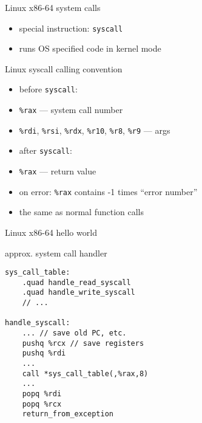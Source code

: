 \begin{frame}{Linux x86-64 system calls}
\begin{itemize}
\item special instruction: {\tt syscall}
\item runs OS specified code in kernel mode
\end{itemize}
\end{frame}

\begin{frame}[fragile,label=LinuxSyscall]{Linux syscall calling convention}
\begin{itemize}
\item before {\tt syscall}:
\item \lstinline|%rax| --- system call number
\item \lstinline|%rdi|, \lstinline|%rsi|, \lstinline|%rdx|, \lstinline|%r10|, \lstinline|%r8|, \lstinline|%r9| --- args
\vspace{.5cm}
\item after {\tt syscall}:
\item \lstinline|%rax| --- return value
\item on error: \lstinline|%rax| contains -1 times ``error number''
\vspace{.5cm}
\item {} the same as normal function calls
\end{itemize}
\end{frame}

\begin{frame}{Linux x86-64 hello world}

\end{frame}

\begin{frame}[fragile,label=sysHandler]{approx. system call handler}
\begin{lstlisting}
sys_call_table:
    .quad handle_read_syscall
    .quad handle_write_syscall
    // ...

handle_syscall:
    ... // save old PC, etc.
    pushq %rcx // save registers
    pushq %rdi
    ...
    call *sys_call_table(,%rax,8)
    ...
    popq %rdi
    popq %rcx
    return_from_exception
\end{lstlisting}
\end{frame}


